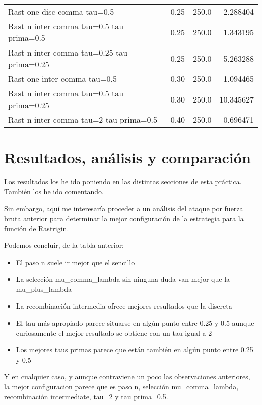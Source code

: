 \documentclass[11pt]{article}
\begin{document}
\begin{tabular}{lrrr}
Rast one disc  comma tau=0.5               &  0.25 &  250.0 &   2.288404 \\
Rast n inter comma tau=0.5 tau prima=0.5   &  0.25 &  250.0 &   1.343195 \\
Rast n inter comma tau=0.25 tau prima=0.25 &  0.25 &  250.0 &   5.263288 \\
Rast one inter comma tau=0.5               &  0.30 &  250.0 &   1.094465 \\
Rast n inter comma tau=0.5 tau prima=0.25  &  0.30 &  250.0 &  10.345627 \\
Rast n inter comma tau=2 tau prima=0.5     &  0.40 &  250.0 &   0.696471 \\
\bottomrule
\end{tabular}

    

    \section{Resultados, análisis y
comparación}\label{resultados-anuxe1lisis-y-comparaciuxf3n}

Los resultados los he ido poniendo en las distintas secciones de esta
práctica. También los he ido comentando.

Sin embargo, aquí me interesaría proceder a un análisis del ataque por
fuerza bruta anterior para determinar la mejor configuración de la
estrategia para la función de Rastrigin.

Podemos concluir, de la tabla anterior:

\begin{itemize}
\item
  El paso n suele ir mejor que el sencillo
\item
  La selección mu\_comma\_lambda sin ninguna duda van mejor que la
  mu\_plus\_lambda
\item
  La recombinación intermedia ofrece mejores resultados que la discreta
\item
  El tau más apropiado parece situarse en algún punto entre 0.25 y 0.5
  aunque curiosamente el mejor resultado se obtiene con un tau igual a 2
\item
  Los mejores taus primas parece que están también en algún punto entre
  0.25 y 0.5
\end{itemize}

Y en cualquier caso, y aunque contraviene un poco las observaciones
anteriores, la mejor configuracion parece que es paso n, selección
mu\_comma\_lambda, recombinación intermediate, tau=2 y tau prima=0.5.
\end{document}
